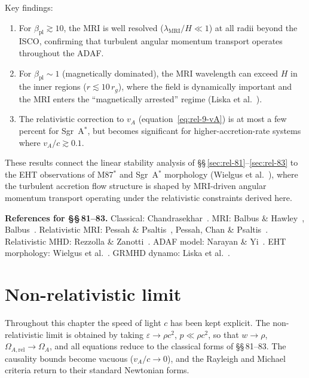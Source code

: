 Key findings:
\begin{enumerate}
\item For $\beta_{\mathrm{pl}} \gtrsim 10$, the MRI is well resolved
  ($\lambda_{\mathrm{MRI}}/H \ll 1$) at all radii beyond the ISCO,
  confirming that turbulent angular momentum transport operates
  throughout the ADAF.
\item For $\beta_{\mathrm{pl}} \sim 1$ (magnetically dominated), the
  MRI wavelength can exceed $H$ in the inner regions ($r \lesssim
  10\,r_{g}$), where the field is dynamically important and the MRI
  enters the ``magnetically arrested'' regime
  (Liska et al.~\cite{Liska2021}).
\item The relativistic correction to $v_{A}$
  (equation~\eqref{eq:rel-9-vA}) is at most a few percent for
  Sgr~A$^{*}$, but becomes significant for higher-accretion-rate
  systems where $v_{A}/c \gtrsim 0.1$.
\end{enumerate}
These results connect the linear stability analysis of
\S\S\,\ref{sec:rel-81}--\ref{sec:rel-83} to the EHT observations of
M87$^{*}$ and Sgr~A$^{*}$ morphology (Wielgus et
al.~\cite{Wielgus2020}), where the turbulent accretion flow structure
is shaped by MRI-driven angular momentum transport operating under
the relativistic constraints derived here.

\medskip
\noindent\textbf{References for \S\S\,81--83.}
Classical: Chandrasekhar~\cite{Chandrasekhar1961}.
MRI: Balbus \& Hawley~\cite{BalbusSHawley1991},
Balbus~\cite{Balbus2003}.
Relativistic MRI: Pessah \& Psaltis~\cite{PessahPsaltis2005},
Pessah, Chan \& Psaltis~\cite{PessahChanPsaltis2008}.
Relativistic MHD: Rezzolla \& Zanotti~\cite{RezzollaZanotti2013}.
ADAF model: Narayan \& Yi~\cite{NarayanYi1994}.
EHT morphology: Wielgus et al.~\cite{Wielgus2020}.
GRMHD dynamo: Liska et al.~\cite{Liska2021}.

\section*{Non-relativistic limit}
\label{sec:rel-9-NRlimit}

Throughout this chapter the speed of light $c$ has been kept explicit.
The non-relativistic limit is obtained by taking
$\varepsilon\to\rho c^{2}$, $p\ll\rho c^{2}$, so that
$w\to\rho$, $\Omega_{A,\mathrm{rel}}\to\Omega_{A}$, and all
equations reduce to the classical forms of \S\S\,81--83.  The
causality bounds become vacuous ($v_{A}/c\to 0$), and the Rayleigh and
Michael criteria return to their standard Newtonian forms.

